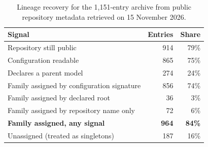 \begin{table}[!htb]\centering\small
\caption{Lineage recovery for the 1,151-entry archive from public repository metadata retrieved on 15 November 2026.}\label{tab:coverage}
\begin{tabular}{lrr}
\toprule
Signal & Entries & Share\\
\midrule
Repository still public & 914 & 79\%\\
Configuration readable & 865 & 75\%\\
Declares a parent model & 274 & 24\%\\
\midrule
Family assigned by configuration signature & 856 & 74\%\\
Family assigned by declared root & 36 & 3\%\\
Family assigned by repository name only & 72 & 6\%\\
\textbf{Family assigned, any signal} & \textbf{964} & \textbf{84\%}\\
Unassigned (treated as singletons) & 187 & 16\%\\
\bottomrule
\end{tabular}
\end{table}
